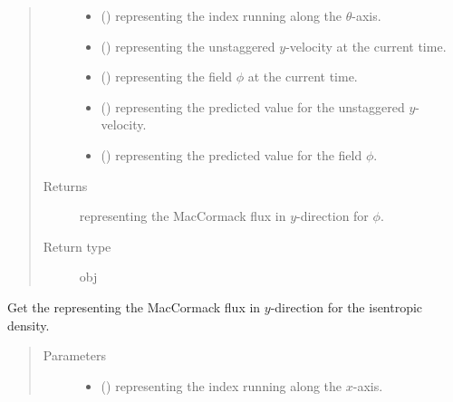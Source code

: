 \documentclass[letterpaper,10pt,english]{sphinxmanual}
\begin{document}
\begin{fulllineitems}
\begin{fulllineitems}
\begin{quote}
\begin{description}
\begin{itemize}
\item {} 
 () \textendash{}  representing the index running along the \(\theta\)-axis.

\item {} 
 () \textendash{}  representing the unstaggered \(y\)-velocity at the current time.

\item {} 
 () \textendash{}  representing the field \(\phi\) at the current time.

\item {} 
 () \textendash{}  representing the predicted value for the unstaggered \(y\)-velocity.

\item {} 
 () \textendash{}  representing the predicted value for the field \(\phi\).

\end{itemize}

\item[{Returns}] \leavevmode
{} representing the MacCormack flux in \(y\)-direction for \(\phi\).

\item[{Return type}] \leavevmode
obj

\end{description}\end{quote}

\end{fulllineitems}


\begin{fulllineitems}
\label{\detokenize{api:dycore.flux_isentropic_maccormack.FluxIsentropicMacCormack._get_maccormack_flux_y_density}}
Get the  representing the MacCormack flux in \(y\)-direction for the
isentropic density.
\begin{quote}\begin{description}
\item[{Parameters}] \leavevmode\begin{itemize}
\item {} 
 () \textendash{}  representing the index running along the \(x\)-axis.


\end{itemize}
\end{description}
\end{quote}
\end{fulllineitems}
\end{fulllineitems}
\end{document}
